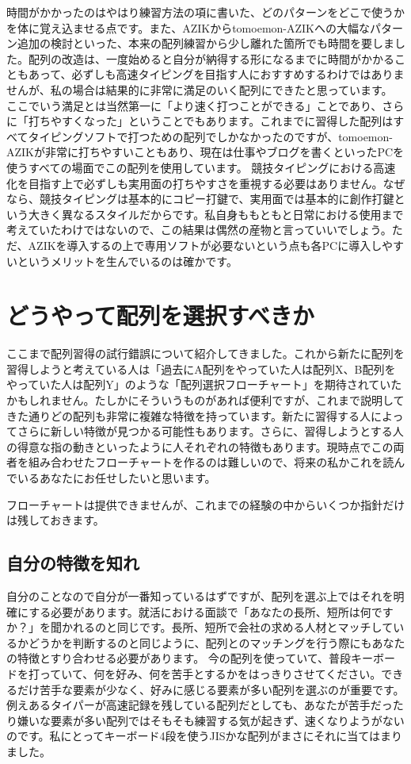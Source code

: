 時間がかかったのはやはり練習方法の項に書いた、どのパターンをどこで使うかを体に覚え込ませる点です。また、AZIKからtomoemon-AZIKへの大幅なパターン追加の検討といった、本来の配列練習から少し離れた箇所でも時間を要しました。配列の改造は、一度始めると自分が納得する形になるまでに時間がかかることもあって、必ずしも高速タイピングを目指す人におすすめするわけではありませんが、私の場合は結果的に非常に満足のいく配列にできたと思っています。
ここでいう満足とは当然第一に「より速く打つことができる」ことであり、さらに「打ちやすくなった」ということでもあります。これまでに習得した配列はすべてタイピングソフトで打つための配列でしかなかったのですが、tomoemon-AZIKが非常に打ちやすいこともあり、現在は仕事やブログを書くといったPCを使うすべての場面でこの配列を使用しています。
競技タイピングにおける高速化を目指す上で必ずしも実用面の打ちやすさを重視する必要はありません。なぜなら、競技タイピングは基本的にコピー打鍵で、実用面では基本的に創作打鍵という大きく異なるスタイルだからです。私自身ももともと日常における使用まで考えていたわけではないので、この結果は偶然の産物と言っていいでしょう。ただ、AZIKを導入するの上で専用ソフトが必要ないという点も各PCに導入しやすいというメリットを生んでいるのは確かです。


\section{どうやって配列を選択すべきか}

ここまで配列習得の試行錯誤について紹介してきました。これから新たに配列を習得しようと考えている人は「過去にA配列をやっていた人は配列X、B配列をやっていた人は配列Y」のような「配列選択フローチャート」を期待されていたかもしれません。たしかにそういうものがあれば便利ですが、これまで説明してきた通りどの配列も非常に複雑な特徴を持っています。新たに習得する人によってさらに新しい特徴が見つかる可能性もあります。さらに、習得しようとする人の得意な指の動きといったように人それぞれの特徴もあります。現時点でこの両者を組み合わせたフローチャートを作るのは難しいので、将来の私かこれを読んでいるあなたにお任せしたいと思います。

フローチャートは提供できませんが、これまでの経験の中からいくつか指針だけは残しておきます。

\subsection{自分の特徴を知れ}

自分のことなので自分が一番知っているはずですが、配列を選ぶ上ではそれを明確にする必要があります。就活における面談で「あなたの長所、短所は何ですか？」を聞かれるのと同じです。長所、短所で会社の求める人材とマッチしているかどうかを判断するのと同じように、配列とのマッチングを行う際にもあなたの特徴とすり合わせる必要があります。
今の配列を使っていて、普段キーボードを打っていて、何を好み、何を苦手とするかをはっきりさせてください。できるだけ苦手な要素が少なく、好みに感じる要素が多い配列を選ぶのが重要です。例えあるタイパーが高速記録を残している配列だとしても、あなたが苦手だったり嫌いな要素が多い配列ではそもそも練習する気が起きず、速くなりようがないのです。私にとってキーボード4段を使うJISかな配列がまさにそれに当てはまりました。


